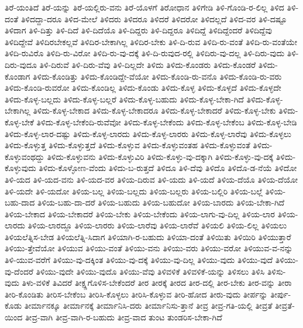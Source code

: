 {ತಿರೆ-ಯಂತಿದೆ
ತಿರೆ-ಯನ್ನು
ತಿರೆ-ಯಲ್ಲಿರು-ವನು
ತಿರೆ-ಯೊಳಗೆ
ತಿರೋಧಾನ
ತಿಳಿಗೇಡಿ
ತಿಳಿ-ಗೊಂಡಿ-ರ-ಲಿಲ್ಲ
ತಿಳಿದ
ತಿಳಿ-ದಂತೆ
ತಿಳಿದದ್ದಾ-ದರೂ
ತಿಳಿದ-ಮೇಲೆ
ತಿಳಿದರು
ತಿಳಿದರೂ
ತಿಳಿದರೆ
ತಿಳಿದರೋ
ತಿಳಿದಲ್ಲದೆ
ತಿಳಿದ-ವರ
ತಿಳಿ-ದಷ್ಟೂ
ತಿಳಿದಾಗ
ತಿಳಿ-ದಿತ್ತು
ತಿಳಿ-ದಿದೆ
ತಿಳಿ-ದಿದೆಯೊ
ತಿಳಿ-ದಿದ್ದರು
ತಿಳಿ-ದಿದ್ದರೂ
ತಿಳಿದಿದ್ದೆ
ತಿಳಿದಿದ್ದೆಂದರೆ
ತಿಳಿದಿದ್ದೆವು
ತಿಳಿದಿದ್ದೇವೆ
ತಿಳಿದಿರಬೇಕಲ್ಲವೆ
ತಿಳಿದಿರ-ಬೇಕಾಗಿಲ್ಲ
ತಿಳಿದಿರ-ಬೇಕು
ತಿಳಿ-ದಿ-ರುವ
ತಿಳಿದಿ-ರು-ವಂತೆ
ತಿಳಿದಿ-ರು-ವಂತೆಯೇ
ತಿಳಿದಿ-ರುವಿರೊ
ತಿಳಿದಿ-ರು-ವಿರೋ
ತಿಳಿದಿ-ರು-ವು-ದಕ್ಕೆ
ತಿಳಿ-ದಿ-ರುವುದ-ರಲ್ಲಿ
ತಿಳಿದಿರು-ವು-ದಲ್ಲ
ತಿಳಿ-ದಿರು-ವುದು
ತಿಳಿ-ದಿರು-ವುದೂ
ತಿಳಿ-ದಿರುವೆ
ತಿಳಿ-ದಿರು-ವೆವು
ತಿಳಿ-ದಿಲ್ಲದೇ
ತಿಳಿದು
ತಿಳಿದು-ಕೊಂಡರು
ತಿಳಿದು-ಕೊಂಡರೆ
ತಿಳಿದು-ಕೊಂಡಾಗ
ತಿಳಿದು-ಕೊಂಡಿತ್ತು
ತಿಳಿದು-ಕೊಂಡಿದ್ದೇ-ವೆಯೋ
ತಿಳಿದು-ಕೊಂಡಿ-ರು-ವನೊ
ತಿಳಿದು-ಕೊಂಡಿ-ರು-ವರು
ತಿಳಿದು-ಕೊಂಡಿ-ರುವರೋ
ತಿಳಿದು-ಕೊಂಡಿಲ್ಲ
ತಿಳಿದು-ಕೊಂಡು
ತಿಳಿದು-ಕೊಳ್ಳ
ತಿಳಿದು-ಕೊಳ್ಳದೆ
ತಿಳಿದು-ಕೊಳ್ಳದೇ
ತಿಳಿದು-ಕೊಳ್ಳ-ಬಲ್ಲದು
ತಿಳಿದು-ಕೊಳ್ಳ-ಬಲ್ಲರೆ
ತಿಳಿದು-ಕೊಳ್ಳ-ಬಹುದು
ತಿಳಿದು-ಕೊಳ್ಳ-ಬೇಕಾ-ಗಿದೆ
ತಿಳಿದು-ಕೊಳ್ಳ-ಬೇಕಾಗಿಲ್ಲ
ತಿಳಿದು-ಕೊಳ್ಳ-ಬೇಕಾದ
ತಿಳಿದು-ಕೊಳ್ಳ-ಬೇಕಾದರೂ
ತಿಳಿದು-ಕೊಳ್ಳ-ಬೇಕಾದರೆ
ತಿಳಿದು-ಕೊಳ್ಳ-ಬೇಕು
ತಿಳಿದು-ಕೊಳ್ಳ-ಬೇಕೆ
ತಿಳಿದು-ಕೊಳ್ಳ-ಬೇಕೆಂದಿ-ರುವೆವೋ
ತಿಳಿದು-ಕೊಳ್ಳ-ಬೇಕೆಂದು
ತಿಳಿದು-ಕೊಳ್ಳ-ಬೇಕೆಂಬ
ತಿಳಿದು-ಕೊಳ್ಳ-ಬೇಡಿ
ತಿಳಿದು-ಕೊಳ್ಳ-ಲಾರ-ದಷ್ಟು
ತಿಳಿದು-ಕೊಳ್ಳ-ಲಾರದು
ತಿಳಿದು-ಕೊಳ್ಳ-ಲಾರರು
ತಿಳಿದು-ಕೊಳ್ಳ-ಲಾರೆವು
ತಿಳಿದು-ಕೊಳ್ಳಲು
ತಿಳಿದು-ಕೊಳ್ಳುತ್ತ
ತಿಳಿದು-ಕೊಳ್ಳುತ್ತದೆ
ತಿಳಿದು-ಕೊಳ್ಳುವ
ತಿಳಿದು-ಕೊಳ್ಳುವಂತಹ
ತಿಳಿದು-ಕೊಳ್ಳುವಂತೆ
ತಿಳಿದು-ಕೊಳ್ಳುವಂಥದ್ದು
ತಿಳಿದು-ಕೊಳ್ಳುವನು
ತಿಳಿದು-ಕೊಳ್ಳುವಿರಿ
ತಿಳಿದು-ಕೊಳ್ಳು-ವು-ದಕ್ಕಾಗಿ
ತಿಳಿದು-ಕೊಳ್ಳು-ವು-ದಕ್ಕೆ
ತಿಳಿದು-ಕೊಳ್ಳುವುದು
ತಿಳಿದು-ಕೊಳ್ಳೋಣ-ವೆಂದು
ತಿಳಿದು-ಬ-ರುತ್ತದೆ
ತಿಳಿದೂ
ತಿಳಿ-ದೆವು
ತಿಳಿದೊ
ತಿಳಿದೊ-ಡ-ನೆಯೆ
ತಿಳಿದೋ
ತಿಳಿ-ಯದ
ತಿಳಿ-ಯದ-ವನು
ತಿಳಿ-ಯದ-ವರ
ತಿಳಿಯ-ದಿರುವ
ತಿಳಿ-ಯದು
ತಿಳಿ-ಯದೆ
ತಿಳಿಯ-ದೆಯೊ
ತಿಳಿಯ-ದೆಯೋ
ತಿಳಿ-ಯದೇ
ತಿಳಿ-ಯದೋ
ತಿಳಿಯ-ಬಲ್ಲ
ತಿಳಿಯ-ಬಲ್ಲದು
ತಿಳಿಯ-ಬಲ್ಲರು
ತಿಳಿಯ-ಬಲ್ಲಿರಿ
ತಿಳಿಯ-ಬಲ್ಲೆ
ತಿಳಿಯ-ಬಹು-ದಾದ
ತಿಳಿಯ-ಬಹು-ದಾ-ದರೆ
ತಿಳಿಯ-ಬಹುದು
ತಿಳಿಯ-ಬಹುದೋ
ತಿಳಿಯ-ಬಾರದು
ತಿಳಿಯ-ಬೇಕಾ-ಗಿದೆ
ತಿಳಿಯ-ಬೇಕಾದ
ತಿಳಿಯ-ಬೇಕಾದರೆ
ತಿಳಿಯ-ಬೇಕು
ತಿಳಿಯ-ಬೇಕೆಂದು
ತಿಳಿಯ-ಲಾಗು-ವು-ದಿಲ್ಲ
ತಿಳಿಯ-ಲಾರ
ತಿಳಿಯ-ಲಾರದು
ತಿಳಿಯ-ಲಾರದ್ದೂ
ತಿಳಿಯ-ಲಾರರು
ತಿಳಿಯ-ಲಾರೆವು
ತಿಳಿಯ-ಲಾರೆವೆ
ತಿಳಿಯಲಿ
ತಿಳಿಯ-ಲಿಲ್ಲ
ತಿಳಿಯಲು
ತಿಳಿಯಲೆತ್ನಿಸ-ಬೇಡ
ತಿಳಿಯಲೆತ್ನಿ-ಸಿದಾಗ
ತಿಳಿಯಾಗಿ-ರ-ಬಹುದು
ತಿಳಿಯಾ-ದಂತೆ
ತಿಳಿಯಿತು
ತಿಳಿಯಿರಿ
ತಿಳಿಯುತ್ತಾರೆ
ತಿಳಿಯು-ತ್ತೇವೆಯೋ
ತಿಳಿಯುವ
ತಿಳಿಯು-ವಂತೆ
ತಿಳಿಯು-ವನು
ತಿಳಿಯು-ವರು
ತಿಳಿಯು-ವರೋ
ತಿಳಿಯುವ-ವ-ನನ್ನು
ತಿಳಿ-ಯುವ-ವರೆಗೆ
ತಿಳಿಯು-ವು-ದಕ್ಕಿಂತ
ತಿಳಿಯು-ವು-ದಕ್ಕೆ
ತಿಳಿಯು-ವು-ದಿಲ್ಲ
ತಿಳಿಯು-ವುದು
ತಿಳಿಯು-ವುದೆ
ತಿಳಿಯು-ವು-ದೆಂದರೆ
ತಿಳಿಯು-ವುದೇ
ತಿಳಿಯು-ವುದೊ
ತಿಳಿಯು-ವೆವು
ತಿಳಿವಳಿಕೆ
ತಿಳಿವಳಿಕೆ-ಯನ್ನು
ತಿಳಿಸಲು
ತಿಳಿಸಿ
ತಿಳಿಸು-ವುದು
ತಿಳು-ವಳಿಕೆ
ತಿವಿದರೆ
ತೀಕ್ಷ್ಣಗೊಳಿಸ-ಬೇಕೆಂದರೆ
ತೀರ
ತೀರಕ್ಕೆ
ತೀರದ
ತೀರ-ದಲ್ಲಿ
ತೀರ-ಬೇಕು
ತೀರ-ವನ್ನು
ತೀರಾ
ತೀರಿ-ಕೊಂಡಿತು
ತೀರಿಸ-ಬೇಕೆಂಬ
ತೀರಿಸಿ-ಕೊಳ್ಳಲು
ತೀರಿಸಿ-ಕೊಳ್ಳುವ
ತೀರಿ-ಹೋದ
ತೀರು-ವುದು
ತೀರ್ಪನ್ನು
ತೀರ್ಪು-ಕೊಡು
ತೀರ್ಮಾನಕ್ಕೂ
ತೀರ್ಮಾನಕ್ಕೆ
ತೀರ್ಮಾನಿಸಿ-ದರು
ತೀರ್ಮಾನಿಸು-ತ್ತಾನೆ
ತೀವ್ರ
ತೀವ್ರ-ಗತಿ-ಯಲ್ಲಿ
ತೀವ್ರತೆ
ತೀವ್ರತೆ-ಯಿಂದ
ತೀವ್ರ-ವಾಗಿ
ತೀವ್ರ-ವಾಗಿ-ರ-ಬಹುದು
ತೀವ್ರ-ವಾದ
ತುಂಟ
ತುಂಡರಿಸ-ಬೇಕಾ-ಗಿದೆ
}
